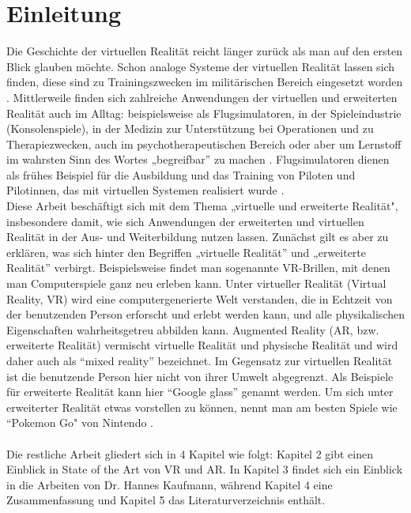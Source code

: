 \documentclass[deutsch]{llncs}
\begin{document}
\tableofcontents
\newpage
{}
\section{Einleitung}
\label{sec:intro}
Die Geschichte der virtuellen Realität reicht länger zurück als man auf den ersten Blick glauben möchte. Schon analoge Systeme der virtuellen Realität lassen sich finden, diese sind zu Trainingszwecken im militärischen Bereich eingesetzt worden \cite{vrnerds}.
Mittlerweile finden sich zahlreiche Anwendungen der virtuellen und erweiterten Realität auch im Alltag: beispielsweise als Flugsimulatoren, in der Spieleindustrie (Konsolenspiele), in der Medizin zur Unterstützung bei Operationen und zu Therapiezwecken, auch im psychotherapeutischen Bereich oder aber um Lernstoff im wahrsten Sinn des Wortes „begreifbar'' zu machen \cite{Klampfer}. 
Flugsimulatoren dienen als frühes Beispiel für die Ausbildung und das Training von Piloten und Pilotinnen, das mit virtuellen Systemen realisiert wurde  \cite{Klampfer}.\\
Diese Arbeit beschäftigt sich mit dem Thema „virtuelle und erweiterte Realität", insbesondere damit, wie sich Anwendungen der erweiterten und virtuellen Realität in der Aus- und Weiterbildung nutzen lassen. 
Zunächst gilt es aber zu erklären, was sich hinter den Begriffen „virtuelle Realität'' und „erweiterte Realität'' verbirgt. 
Beispielsweise findet man sogenannte VR-Brillen, mit denen man Computerspiele ganz neu erleben kann.
\label{sec:typo}
Unter virtueller Realität (Virtual Reality, VR) wird eine computergenerierte Welt verstanden, die in Echtzeit von der benutzenden Person erforscht und erlebt werden kann, und alle physikalischen Eigenschaften wahrheitsgetreu abbilden kann. 
Augmented Reality (AR, bzw. erweiterte Realität) vermischt virtuelle Realität und physische Realität und wird daher auch als ``mixed reality'' bezeichnet. Im Gegensatz zur virtuellen Realität ist die benutzende Person hier nicht von ihrer Umwelt abgegrenzt.
Als Beispiele für erweiterte Realität kann hier ``Google glass'' genannt werden. 
Um sich unter erweiterter Realität etwas vorstellen zu können, nennt man am besten Spiele wie ``Pokemon Go"  von Nintendo \cite{Klampfer}.\\
\noindent \\
Die restliche Arbeit gliedert sich in 4 Kapitel wie folgt: 
Kapitel 2 gibt einen Einblick in State of the Art von VR und AR. In Kapitel 3 findet sich ein Einblick in die Arbeiten von Dr. Hannes Kaufmann, während Kapitel 4 eine Zusammenfassung und Kapitel 5 das Literaturverzeichnis enthält.
\end{document}
